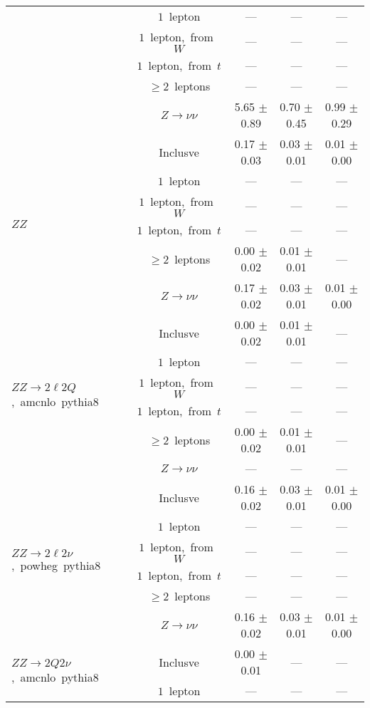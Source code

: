 \documentclass{article}
\begin{document}
\begin{longtable}{|l|c|c|c|c|}
 & $1$~lepton  & ---  & ---  & --- \\* 
 & $1$~lepton,~from~$W$  & ---  & ---  & --- \\* 
 & $1$~lepton,~from~$t$  & ---  & ---  & --- \\* 
 & $\ge2$~leptons  & ---  & ---  & --- \\* 
 & $Z\rightarrow\nu\nu$  & 5.65 $\pm$ 0.89  & 0.70 $\pm$ 0.45  & 0.99 $\pm$ 0.29 \\* 
\hline 
\multirow{6}{*}{$ZZ$} & Inclusve  & 0.17 $\pm$ 0.03  & 0.03 $\pm$ 0.01  & 0.01 $\pm$ 0.00 \\* 
 & $1$~lepton  & ---  & ---  & --- \\* 
 & $1$~lepton,~from~$W$  & ---  & ---  & --- \\* 
 & $1$~lepton,~from~$t$  & ---  & ---  & --- \\* 
 & $\ge2$~leptons  & 0.00 $\pm$ 0.02  & 0.01 $\pm$ 0.01  & --- \\* 
 & $Z\rightarrow\nu\nu$  & 0.17 $\pm$ 0.02  & 0.03 $\pm$ 0.01  & 0.01 $\pm$ 0.00 \\* 
\hline 
\multirow{6}{*}{$ZZ{\rightarrow}2{\ell}2Q$,~amcnlo~pythia8} & Inclusve  & 0.00 $\pm$ 0.02  & 0.01 $\pm$ 0.01  & --- \\* 
 & $1$~lepton  & ---  & ---  & --- \\* 
 & $1$~lepton,~from~$W$  & ---  & ---  & --- \\* 
 & $1$~lepton,~from~$t$  & ---  & ---  & --- \\* 
 & $\ge2$~leptons  & 0.00 $\pm$ 0.02  & 0.01 $\pm$ 0.01  & --- \\* 
 & $Z\rightarrow\nu\nu$  & ---  & ---  & --- \\* 
\hline 
\multirow{6}{*}{$ZZ{\rightarrow}2{\ell}2{\nu}$,~powheg~pythia8} & Inclusve  & 0.16 $\pm$ 0.02  & 0.03 $\pm$ 0.01  & 0.01 $\pm$ 0.00 \\* 
 & $1$~lepton  & ---  & ---  & --- \\* 
 & $1$~lepton,~from~$W$  & ---  & ---  & --- \\* 
 & $1$~lepton,~from~$t$  & ---  & ---  & --- \\* 
 & $\ge2$~leptons  & ---  & ---  & --- \\* 
 & $Z\rightarrow\nu\nu$  & 0.16 $\pm$ 0.02  & 0.03 $\pm$ 0.01  & 0.01 $\pm$ 0.00 \\* 
\hline 
\multirow{6}{*}{$ZZ{\rightarrow}2Q2{\nu}$,~amcnlo~pythia8} & Inclusve  & 0.00 $\pm$ 0.01  & ---  & --- \\* 
 & $1$~lepton  & ---  & ---  & --- \\* 

\end{longtable}
\end{document}
